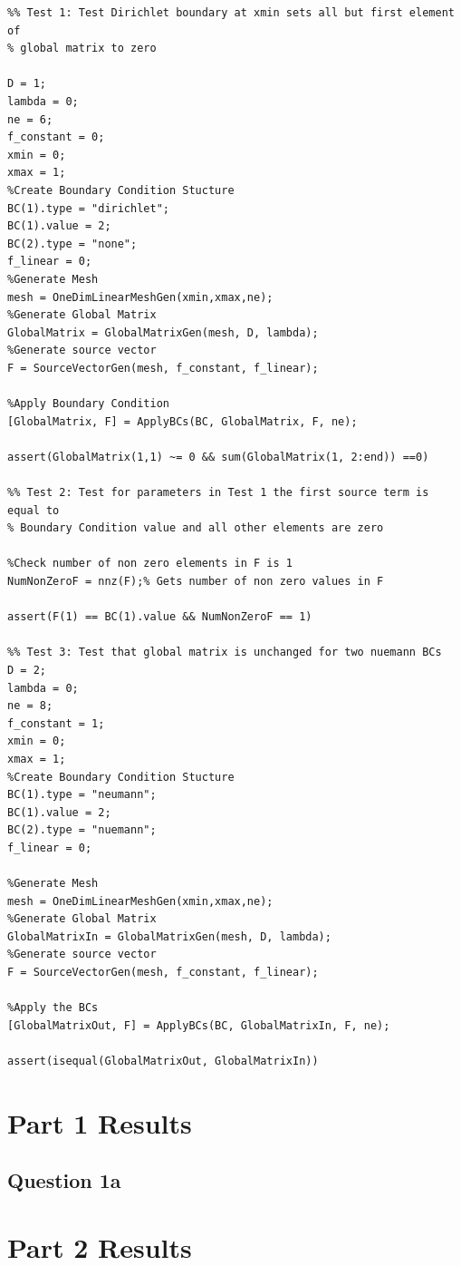 \documentclass[11pt]{article}
\begin{document}
\begin{appendices}
\begin{lstlisting}
%% Test 1: Test Dirichlet boundary at xmin sets all but first element of 
% global matrix to zero

D = 1;
lambda = 0;
ne = 6;
f_constant = 0;
xmin = 0;
xmax = 1;
%Create Boundary Condition Stucture
BC(1).type = "dirichlet";
BC(1).value = 2;
BC(2).type = "none";
f_linear = 0;
%Generate Mesh
mesh = OneDimLinearMeshGen(xmin,xmax,ne);
%Generate Global Matrix
GlobalMatrix = GlobalMatrixGen(mesh, D, lambda);
%Generate source vector
F = SourceVectorGen(mesh, f_constant, f_linear);

%Apply Boundary Condition
[GlobalMatrix, F] = ApplyBCs(BC, GlobalMatrix, F, ne);

assert(GlobalMatrix(1,1) ~= 0 && sum(GlobalMatrix(1, 2:end)) ==0) 

%% Test 2: Test for parameters in Test 1 the first source term is equal to
% Boundary Condition value and all other elements are zero

%Check number of non zero elements in F is 1
NumNonZeroF = nnz(F);% Gets number of non zero values in F

assert(F(1) == BC(1).value && NumNonZeroF == 1)

%% Test 3: Test that global matrix is unchanged for two nuemann BCs
D = 2;
lambda = 0;
ne = 8;
f_constant = 1;
xmin = 0;
xmax = 1;
%Create Boundary Condition Stucture
BC(1).type = "neumann";
BC(1).value = 2;
BC(2).type = "nuemann";
f_linear = 0;

%Generate Mesh
mesh = OneDimLinearMeshGen(xmin,xmax,ne);
%Generate Global Matrix
GlobalMatrixIn = GlobalMatrixGen(mesh, D, lambda);
%Generate source vector
F = SourceVectorGen(mesh, f_constant, f_linear);

%Apply the BCs
[GlobalMatrixOut, F] = ApplyBCs(BC, GlobalMatrixIn, F, ne);

assert(isequal(GlobalMatrixOut, GlobalMatrixIn))

\end{lstlisting}

\section{Part 1 Results}\label{ap:results1}

\subsection{Question 1a}\label{ap:Q1a}

\section{Part 2 Results}\label{ap:results2}


\end{appendices}
\end{document}
